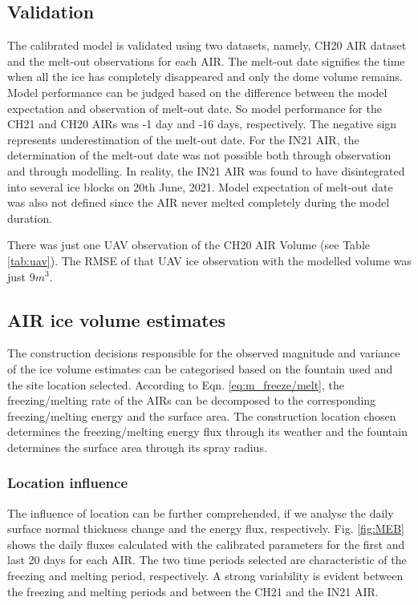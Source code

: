 \documentclass[utf8]{frontiersSCNS} %
\begin{document}
\subsection{Validation}

The calibrated model is validated using two datasets, namely, CH20 AIR dataset and the melt-out observations for
each AIR. The melt-out date signifies the time when all the ice has completely disappeared and only the dome volume
remains. Model performance can be judged based on the difference between the model expectation and observation of
melt-out date.  So model performance for the CH21 and CH20 AIRs was -1 day and -16 days, respectively. The negative
sign represents underestimation of the melt-out date. For the IN21 AIR, the determination of the melt-out date was
not possible both through observation and through modelling.  In reality, the IN21 AIR was found to have
disintegrated into several ice blocks on 20th June, 2021.  Model expectation of melt-out date was also not defined
since the AIR never melted completely during the model duration.

There was just one UAV observation of the CH20 AIR Volume (see Table \ref{tab:uav}).  The RMSE of that UAV ice
observation with the modelled volume was just $9 m^3$.


\subsection{AIR ice volume estimates}

The construction decisions responsible for the observed magnitude and variance of the ice volume estimates can be
categorised based on the fountain used and the site location selected. According to Eqn. \ref{eq:m_freeze/melt}, the
freezing/melting rate of the AIRs can be decomposed to the corresponding freezing/melting energy and the surface
area. The construction location chosen determines the freezing/melting energy flux through its weather and the
fountain determines the surface area through its spray radius.

\subsubsection{Location influence}

The influence of location can be further comprehended, if we analyse the daily surface normal thickness change and the
energy flux, respectively. Fig.  \ref{fig:MEB} shows the daily fluxes calculated with the calibrated parameters for
the first and last 20 days for each AIR. The two time periods selected are characteristic of the freezing and
melting period, respectively. A strong variability is evident between the freezing and melting periods and between
the CH21 and the IN21 AIR.
\end{document}
